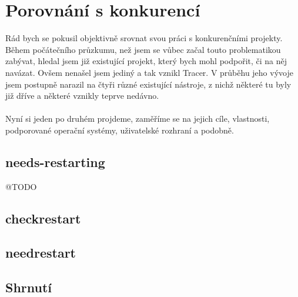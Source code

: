 \documentclass[
  field=inf,
  biblatex,
  glossaries,
  index
]{kidiplom}
\begin{document}
\newpage
\section{Porovnání s konkurencí}
	Rád bych se pokusil objektivně srovnat svou práci s konkurenčními projekty. Během počátečního průzkumu, než jsem se vůbec začal touto problematikou zabývat, hledal jsem již existující projekt, který bych mohl podpořit, či na něj navázat. Ovšem nenašel jsem jediný a tak vznikl Tracer. V průběhu jeho vývoje jsem postupně narazil na čtyři různé existující nástroje, z nichž některé tu byly již dříve a některé vznikly teprve nedávno.
	\\
	\\
	Nyní si jeden po druhém projdeme, zaměříme se na jejich cíle, vlastnosti, podporované operační systémy, uživatelské rozhraní a podobně.
	\subsection{needs-restarting}
	@TODO
	\subsection{checkrestart}
	\subsection{needrestart}
	\subsection{Shrnutí}
\end{document}
